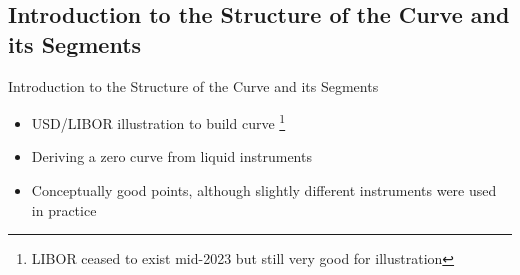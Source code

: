 \documentclass[handout, aspectratio=169]{beamer}
\begin{document}
\subsection{Introduction to the Structure of the Curve and its Segments}
\begin{frame}{Introduction to the Structure of the Curve and its Segments}
  	\begin{itemize}	
		\item USD/LIBOR illustration to build curve \footnote{\tiny LIBOR ceased to exist mid-2023 but still very good for illustration}
		\item Deriving a zero curve from liquid instruments
		\item Conceptually good points, although slightly different instruments were used in practice
	\end{itemize}
\end{frame}
\end{document}
